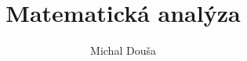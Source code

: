 \documentclass{book}
\title{Matematická analýza}
\author{Michal Douša}
\date{}
\theoremstyle{definition} \newtheorem{exercise}{Úloha}[section]
\begin{document}
\begin{titlepage}
    \maketitle
\end{titlepage}

\tableofcontents




\listoffigures
    
\end{document}
